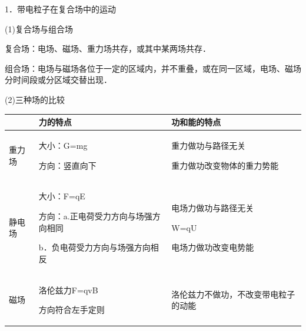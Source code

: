1．带电粒子在复合场中的运动

(1)复合场与组合场

复合场：电场、磁场、重力场共存，或其中某两场共存．

组合场：电场与磁场各位于一定的区域内，并不重叠，或在同一区域，电场、磁场分时间段或分区域交替出现．

(2)三种场的比较

\begin{longtable}[]{@{}m{1cm}m{6cm}m{5cm}@{}}
\toprule
 & \begin{minipage}[b]{0.30\columnwidth}\raggedright
力的特点\strut
\end{minipage} & \begin{minipage}[b]{0.30\columnwidth}\raggedright
功和能的特点\strut
\end{minipage}\tabularnewline
\midrule
\endhead
\begin{minipage}[t]{0.30\columnwidth}\raggedright
重力场\strut
\end{minipage} & \begin{minipage}[t]{0.30\columnwidth}\raggedright
大小：G=mg

方向：竖直向下\strut
\end{minipage} & \begin{minipage}[t]{0.50\columnwidth}\raggedright
重力做功与路径无关

重力做功改变物体的重力势能\strut
\end{minipage}\tabularnewline
\begin{minipage}[t]{0.30\columnwidth}\raggedright
静电场\strut
\end{minipage} & \begin{minipage}[t]{0.50\columnwidth}\raggedright
大小：F=qE

方向：a.正电荷受力方向与场强方向相同

b．负电荷受力方向与场强方向相反\strut
\end{minipage} & \begin{minipage}[t]{0.30\columnwidth}\raggedright
电场力做功与路径无关

W=qU

电场力做功改变电势能\strut
\end{minipage}\tabularnewline
\begin{minipage}[t]{0.30\columnwidth}\raggedright
磁场\strut
\end{minipage} & \begin{minipage}[t]{0.30\columnwidth}\raggedright
洛伦兹力F=qvB

方向符合左手定则\strut
\end{minipage} & \begin{minipage}[t]{0.30\columnwidth}\raggedright
洛伦兹力不做功，不改变带电粒子的动能\strut
\end{minipage}\tabularnewline
\bottomrule
\end{longtable}

